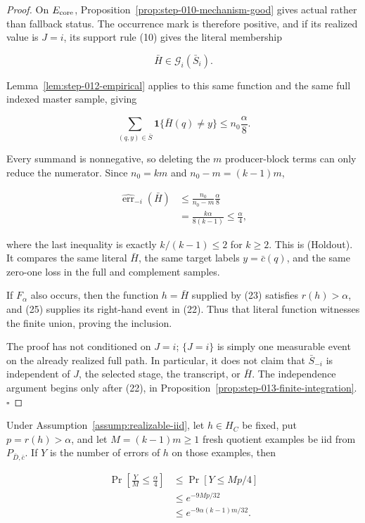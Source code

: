 \begin{proof}
On \(E_{\rm core}\), Proposition~\ref{prop:step-010-mechanism-good} gives actual rather than
fallback status. The  occurrence mark is therefore positive, and
if its realized value is \(J=i\), its support rule (10) gives the literal
membership

\[
 \bar H\in\mathcal G_i(\bar S_i).
 \tag{23}
\]

Lemma~\ref{lem:step-012-empirical} applies to this same function
and the same full indexed master sample, giving

\[
 \sum_{(q,y)\in\bar S}
   \mathbf1\{\bar H(q)\ne y\}
 \leq n_0\frac\alpha8.
 \tag{24}
\]

Every summand is nonnegative, so deleting the \(m\) producer-block terms
can only reduce the numerator. Since \(n_0=km\) and
\(n_0-m=(k-1)m\),

\[
\begin{aligned}
 \widehat{\operatorname{err}}_{-i}(\bar H)
 &\leq\frac{n_0}{n_0-m}\frac\alpha8\\
 &=\frac{k\alpha}{8(k-1)}
 \leq\frac\alpha4,
\end{aligned}
 \tag{25}
\]

where the last inequality is exactly \(k/(k-1)\leq2\) for \(k\geq2\).
This is (Holdout). It compares the same literal \(\bar H\), the same target
labels \(y=\bar c(q)\), and the same zero-one loss in the full and
complement samples.

If \(F_\alpha\) also occurs, then the function \(h=\bar H\) supplied by
(23) satisfies \(r(h)>\alpha\), and (25) supplies its right-hand event in
(22). Thus that literal function witnesses the finite union, proving the
inclusion.

The proof has not conditioned on \(J=i\); \(\{J=i\}\) is simply one
measurable event on the already realized full path. In particular, it does
not claim that \(\bar S_{-i}\) is independent of \(J\), the selected stage,
the transcript, or \(\bar H\). The independence argument begins only after
(22), in Proposition~\ref{prop:step-013-finite-integration}. \(\square\)


\end{proof}

\begin{lemma}\label{lem:step-013-lower-tail}
Under Assumption~\ref{assump:realizable-iid}, let \(h\in H_C\) be fixed,
put \(p=r(h)>\alpha\), and let \(M=(k-1)m\geq1\) fresh quotient examples
be iid from \(P_{\bar D,\bar c}\). If \(Y\) is the number of errors of
\(h\) on those examples, then

\[
\begin{aligned}
 \Pr\left[\frac YM\leq\frac\alpha4\right]
 &\leq \Pr[Y\leq Mp/4]\\
 &\leq e^{-9Mp/32}\\
 &\leq e^{-9\alpha(k-1)m/32}.
\end{aligned}
 \tag{26}
\]


\end{lemma}

